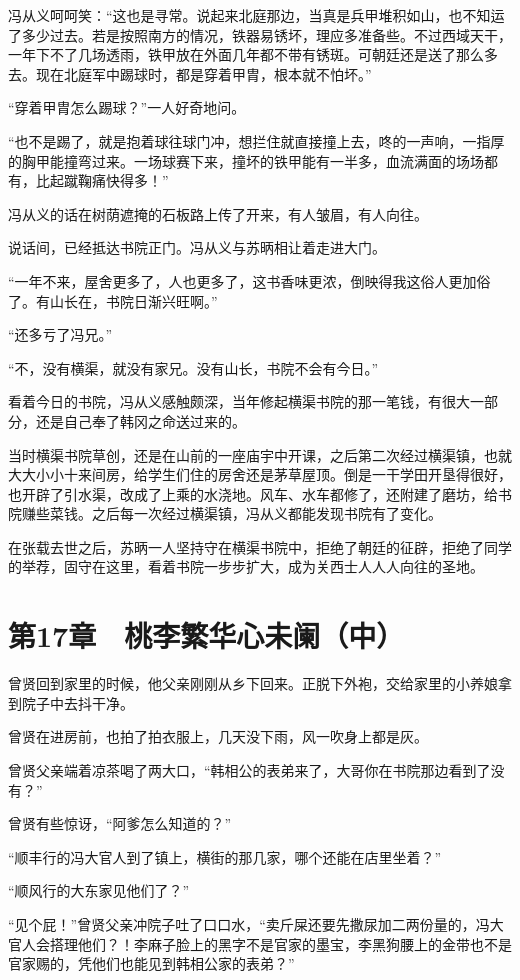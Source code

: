 冯从义呵呵笑：“这也是寻常。说起来北庭那边，当真是兵甲堆积如山，也不知运了多少过去。若是按照南方的情况，铁器易锈坏，理应多准备些。不过西域天干，一年下不了几场透雨，铁甲放在外面几年都不带有锈斑。可朝廷还是送了那么多去。现在北庭军中踢球时，都是穿着甲胄，根本就不怕坏。”

“穿着甲胄怎么踢球？”一人好奇地问。

“也不是踢了，就是抱着球往球门冲，想拦住就直接撞上去，咚的一声响，一指厚的胸甲能撞弯过来。一场球赛下来，撞坏的铁甲能有一半多，血流满面的场场都有，比起蹴鞠痛快得多！”

冯从义的话在树荫遮掩的石板路上传了开来，有人皱眉，有人向往。

说话间，已经抵达书院正门。冯从义与苏昞相让着走进大门。

“一年不来，屋舍更多了，人也更多了，这书香味更浓，倒映得我这俗人更加俗了。有山长在，书院日渐兴旺啊。”

“还多亏了冯兄。”

“不，没有横渠，就没有家兄。没有山长，书院不会有今日。”

看着今日的书院，冯从义感触颇深，当年修起横渠书院的那一笔钱，有很大一部分，还是自己奉了韩冈之命送过来的。

当时横渠书院草创，还是在山前的一座庙宇中开课，之后第二次经过横渠镇，也就大大小小十来间房，给学生们住的房舍还是茅草屋顶。倒是一干学田开垦得很好，也开辟了引水渠，改成了上乘的水浇地。风车、水车都修了，还附建了磨坊，给书院赚些菜钱。之后每一次经过横渠镇，冯从义都能发现书院有了变化。

在张载去世之后，苏昞一人坚持守在横渠书院中，拒绝了朝廷的征辟，拒绝了同学的举荐，固守在这里，看着书院一步步扩大，成为关西士人人人向往的圣地。

\section{第17章　桃李繁华心未阑（中）}

曾贤回到家里的时候，他父亲刚刚从乡下回来。正脱下外袍，交给家里的小养娘拿到院子中去抖干净。

曾贤在进房前，也拍了拍衣服上，几天没下雨，风一吹身上都是灰。

曾贤父亲端着凉茶喝了两大口，“韩相公的表弟来了，大哥你在书院那边看到了没有？”

曾贤有些惊讶，“阿爹怎么知道的？”

“顺丰行的冯大官人到了镇上，横街的那几家，哪个还能在店里坐着？”

“顺风行的大东家见他们了？”

“见个屁！”曾贤父亲冲院子吐了口口水，“卖斤屎还要先撒尿加二两份量的，冯大官人会搭理他们？！李麻子脸上的黑字不是官家的墨宝，李黑狗腰上的金带也不是官家赐的，凭他们也能见到韩相公家的表弟？”

